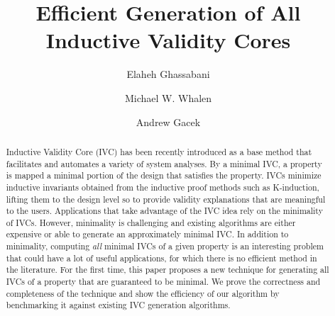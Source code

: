 \documentclass{llncs}
\begin{document}
\newcommand{\mike}[1]{\textcolor{red}{#1}}
\newcommand{\fixed}[1]{\textcolor{purple}{#1}}
\newcommand{\andrew}[1]{\textcolor{green}{#1}}
\newcommand{\ela}[1]{\textcolor{blue}{#1}}
\newcommand{\stateequiv}{\equiv_{s}}
\newcommand{\traceequiv}{\equiv_{\sigma}}
\newcommand{\ta}{\text{TA}}
\newcommand{\cta}{\text{TA$_{C}$}}
\newcommand{\tta}{\text{TA$_{T}$}}

\title{Efficient Generation of All Inductive Validity Cores}

\author{Elaheh Ghassabani
\and Michael W. Whalen
\and Andrew Gacek }
\maketitle

\begin{abstract}
Inductive Validity Core (IVC) has been recently introduced
as a base method that facilitates and automates a variety of system analyses.
  By a minimal IVC, a property is mapped a minimal portion of the design that satisfies the property. IVCs minimize inductive invariants obtained from the inductive proof methods such as K-induction, lifting them to the design level so to provide validity explanations that are meaningful to the users.
   Applications that take advantage of the IVC idea rely on the minimality of IVCs.
However, minimality is challenging and existing algorithms are either expensive or able to generate an approximately minimal IVC. In addition to minimality,
computing \emph{all} minimal IVCs of a given property is
 an interesting problem that could have a lot of useful applications,
  for which there is no efficient method in the literature.
  For the first time, this paper proposes a new technique for generating all IVCs of a property
   that are guaranteed to be minimal. We prove the
   correctness and completeness of the technique and show the efficiency of our algorithm by benchmarking it against existing IVC generation algorithms.
\end{abstract}
\end{document}
